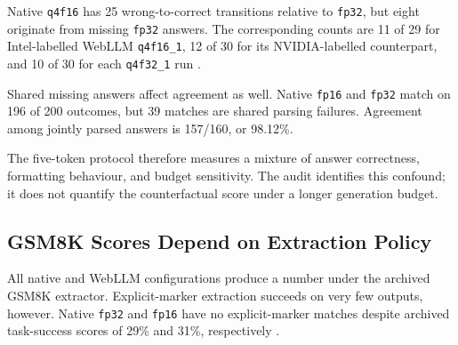 \documentclass[conference]{IEEEtran}
\newcommand{\fp}{\texttt{fp32}}
\newcommand{\fphalf}{\texttt{fp16}}
\newcommand{\qfourhalf}{\texttt{q4f16}}
\newcommand{\mlchalf}{\texttt{q4f16\_1}}
\newcommand{\mlcfull}{\texttt{q4f32\_1}}
\begin{document}
Native \qfourhalf{} has 25 wrong-to-correct transitions
relative to \fp{}, but eight originate from missing \fp{}
answers. The corresponding counts are 11 of 29 for
Intel-labelled WebLLM \mlchalf{}, 12 of 30 for its
NVIDIA-labelled counterpart, and 10 of 30 for each \mlcfull{}
run \cite{repository}.

Shared missing answers affect agreement as well.
Native \fphalf{} and \fp{} match on 196 of 200 outcomes,
but 39 matches are shared parsing failures.
Agreement among jointly parsed answers is 157/160,
or 98.12\%.

The five-token protocol therefore measures a mixture of
answer correctness, formatting behaviour, and budget
sensitivity. The audit identifies this confound; it does
not quantify the counterfactual score under a longer
generation budget.


\subsection{GSM8K Scores Depend on Extraction Policy}
\label{sec:gsmparsing}

All native and WebLLM configurations produce a number under
the archived GSM8K extractor. Explicit-marker extraction
succeeds on very few outputs, however.
Native \fp{} and \fphalf{} have no explicit-marker matches
despite archived task-success scores of 29\% and 31\%,
respectively \cite{repository}.
\end{document}
